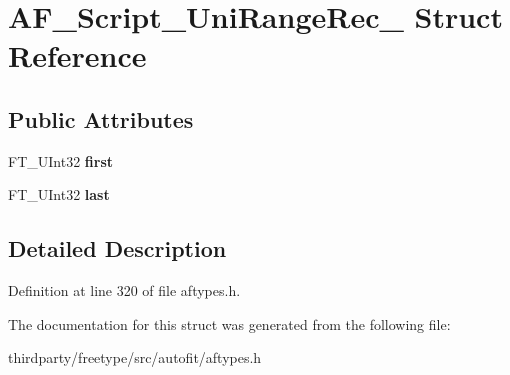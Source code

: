 \hypertarget{struct_a_f___script___uni_range_rec__}{}\section{A\+F\+\_\+\+Script\+\_\+\+Uni\+Range\+Rec\+\_\+ Struct Reference}
\label{struct_a_f___script___uni_range_rec__}
\subsection*{Public Attributes}
\begin{DoxyCompactItemize}
\item 
\mbox{\label{struct_a_f___script___uni_range_rec___aaadebc269ac972321ad0bdbf9936391e}} 
F\+T\+\_\+\+U\+Int32 {\bfseries first}
\item 
\mbox{\label{struct_a_f___script___uni_range_rec___af158de73747a194afb90eac02b4c65ad}} 
F\+T\+\_\+\+U\+Int32 {\bfseries last}
\end{DoxyCompactItemize}


\subsection{Detailed Description}


Definition at line 320 of file aftypes.\+h.



The documentation for this struct was generated from the following file\+:\begin{DoxyCompactItemize}
\item 
thirdparty/freetype/src/autofit/aftypes.\+h\end{DoxyCompactItemize}
